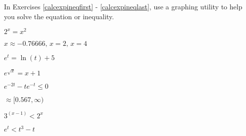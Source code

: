 \documentclass{ximera}
\begin{document}
\begin{question}
In Exercises \ref{calcexpineqfirst} - \ref{calcexpineqlast},  use a graphing utility to help you solve the equation or  inequality.

\begin{problem}\label{calcexpineqfirst} 
$2^{x} = x^2$

\begin{solution}
$x \approx -0.76666, \, x = 2, \, x = 4$
\end{solution}
\end{problem}  

\begin{problem}
$e^{t} = \ln(t) + 5$
\end{problem}

\begin{problem}
$e^{\sqrt{x}} = x + 1$ 
\end{problem} 

\begin{problem}
$e^{-2t}-te^{-t} \leq 0$

\begin{solution}
$\approx [0.567, \infty)$
\end{solution}
\end{problem} 

\begin{problem}
$3^{(x - 1)} < 2^{x}$
\end{problem}

\begin{problem}\label{calcexpineqlast}
$e^{t} < t^{3} - t$
\end{problem}  

\end{question}
\end{document}
